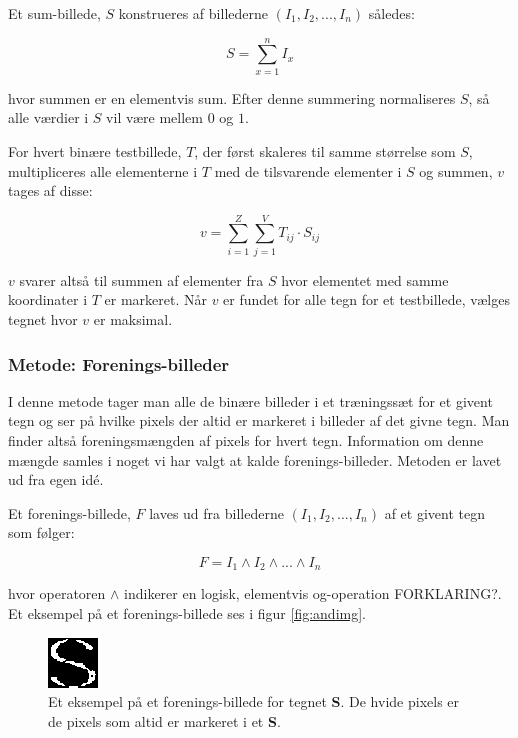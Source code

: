 Et sum-billede, $S$ konstrueres af billederne $(I_{1},I_{2},...,I_{n})$ således:

\begin{displaymath}
	S = \sum_{x=1}^n{I_x}
\end{displaymath}

hvor summen er en elementvis sum. Efter denne summering normaliseres $S$, så alle værdier i $S$ vil være mellem $0$ og $1$.

For hvert binære testbillede, $T$, der først skaleres til samme størrelse som $S$, multipliceres alle elementerne i $T$ med de tilsvarende elementer i $S$ og summen, $v$ tages af disse:

\begin{displaymath}
	v = \sum_{i=1}^Z{\sum_{j=1}^V{T_{ij} \cdot S_{ij}}}
\end{displaymath}

$v$ svarer altså til summen af elementer fra $S$ hvor elementet med samme koordinater i $T$ er markeret. Når $v$ er fundet for alle tegn for et testbillede, vælges tegnet hvor $v$ er maksimal.

\subsubsection*{Metode: Forenings-billeder}

I denne metode tager man alle de binære billeder i et træningssæt for et givent tegn og ser på hvilke pixels der altid er markeret i billeder af det givne tegn. Man finder altså foreningsmængden af pixels for hvert tegn. Information om denne mængde samles i noget vi har valgt at kalde forenings-billeder. Metoden er lavet ud fra egen idé.

Et forenings-billede, $F$ laves ud fra billederne $(I_{1},I_{2},...,I_{n})$ af et givent tegn som følger:

\begin{displaymath}
F = I_1 \wedge I_2 \wedge ... \wedge I_n
\end{displaymath}

hvor operatoren $\wedge$ indikerer en logisk, elementvis og-operation FORKLARING?. Et eksempel på et forenings-billede ses i figur \vref{fig:andimg}.

\begin{figure}[htp]
\centering
\includegraphics{system/illu/andimg.png} 
\caption{Et eksempel på et forenings-billede for tegnet \textbf{S}. De hvide pixels er de pixels som altid er markeret i et \textbf{S}.}
\label{fig:andimg}
\end{figure}

